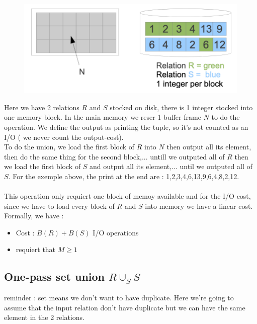 \documentclass[12pt,a4paper]{article}
\begin{document}
\begin{figure}
\vspace{-5mm}
\includegraphics[scale=0.4]{img/img57.png}
\end{figure}
Here we have 2 relations $R$ and $S$ stocked on disk, there is 1 integer stocked into one memory block. In the main memory we reser 1 buffer frame $N$ to do the operation. We define the output as printing the tuple, so it's not counted as an I/O ( we never count the output-cost).\\
To do the union, we load the first block of $R$ into $N$ then output all its element, then do the same thing for the second block,... untill we outputed all of $R$ then we load the first block of $S$ and output all its element,... until we outputed all of $S$. For the exemple above, the print at the end are : 1,2,3,4,6,13,9,6,4,8,2,12.\\
\\
This operation only requiert one block of memoy available and for the I/O cost, since we have to load every block of $R$ and $S$ into memory we have a linear cost. Formally, we have :
\begin{itemize}
\item Cost : $B(R) + B(S)$ I/O operations
\item requiert that $M \geq 1$
\end{itemize}

\subsection{One-pass set union $R \cup_S S$}
reminder : set means we don't want to have duplicate. Here we're going to assume that the input relation don't have duplicate but we can have the same element in the 2 relations.\\
\end{document}
